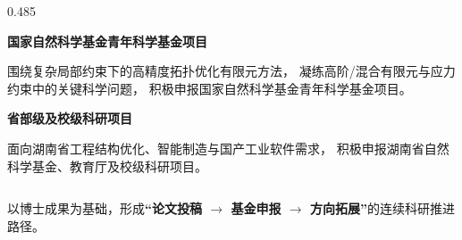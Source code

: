 \documentclass[notheorems]{beamer}
\begin{document}
\begin{frame}
\begin{columns}[T, totalwidth=\linewidth]
\begin{column}{0.485\linewidth}
\begin{tcolorbox}
					{\fontsize{7.5}{11}\selectfont\sffamily
						\textbf{\enspace 国家自然科学基金青年科学基金项目}\par
						\vspace{2pt}
						围绕复杂局部约束下的高精度拓扑优化有限元方法，
						凝练高阶/混合有限元与应力约束中的关键科学问题，
						积极申报国家自然科学基金青年科学基金项目。
						
						\vspace{6pt}
						
						\color{black}
						\textbf{\enspace 省部级及校级科研项目}\par
						\vspace{2pt}
						面向湖南省工程结构优化、智能制造与国产工业软件需求，
						积极申报湖南省自然科学基金、教育厅及校级科研项目。
					}
				\end{tcolorbox}
			\end{column}
			
		\end{columns}
		
		\begin{tcolorbox}[
			colback=structure.fg, colframe=structure.fg,
			arc=3pt, boxrule=0pt,
			top=4pt, bottom=4pt, left=8pt, right=8pt]
			\centering
			{\fontsize{8.5}{12}\selectfont\sffamily\color{white}
				以博士成果为基础，形成\textbf{“论文投稿 $\xrightarrow{}$ 基金申报 $\xrightarrow{}$ 方向拓展”}的连续科研推进路径。}
		\end{tcolorbox}
		
	\end{frame}
	
\end{document}
